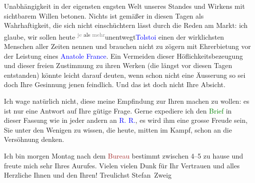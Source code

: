                Unabhängigkeit in der eigensten engsten Welt unseres Standes und Wirkens {\pb}mit sichtbarem Willen betonen. Nichts
               ist gemäßer in diesen Tagen als Wahrhaftigkeit, die sich nicht einschüchtern lässt
               durch die Reden am Markt: ich glaube, wir sollen heute \substVorne{}\textsuperscript{\textcolor{gray}{je} als \textcolor{gray}{mehr}}\substDazwischen{}unentwegt\substHinten{}{ }\textcolor{blue}{Tolstoi}\ledrightnote{\textcolor{blue}{Leo N. von Tolstoi}} einen der wirklichsten Menschen aller
               Zeiten nennen und brauchen nicht zu zögern mit Ehrerbietung vor der Leistung eines
                  \textcolor{blue}{Anatole France}\ledrightnote{\textcolor{blue}{Anatole France}}. Ein Vermeiden dieser
               Höflichkeitsbezeugung und dieser freien Zustimmung zu ihren Werken (die längst vor
               diesen Tagen entstanden) könnte leicht darauf deuten, wenn schon nicht eine Äusserung
               so sei doch Ihre Gesinnung jenen feindlich. Und das ist doch nicht Ihre Absicht.\pend
           
\pstart
           Ich
               wage natürlich nicht, diese meine Empfindung zur Ihren machen zu wollen: es ist nur
               eine Antwort auf Ihre gütige Frage. Gerne expediere ich den {\pb}\textcolor{green}{Brief}\ledrightnote{{$\rightarrow$}\emph{\textcolor{green}{Une protestation d’Arthur Schnitzler}}} in dieser Fassung wie in jeder andern an \textcolor{blue}{R. R.}\ledrightnote{\textcolor{blue}{Romain Rolland}}, es wird ihm eine grosse Freude sein, Sie
               unter den Wenigen zu wissen, die heute, mitten im Kampf, schon an die Versöhnung
               denken.\pend
           
\pstart
           Ich bin morgen Montag nach dem \textcolor{brown}{Bureau}\ledrightnote{{$\rightarrow$}\emph{\textcolor{brown}{Kriegsarchiv}}} bestimmt zwischen 4–5 zu hause und freute mich sehr Ihres Aurufes.
               Vielen vielen Dunk für Ihr Vertrauen und alles Herzliche Ihnen und den Ihren!
               Treulichst\pend
           \pstart \spacefill\mbox{Stefan Zweig}\pend{}\endnumbering{}  
      
